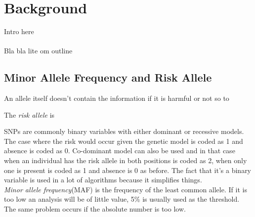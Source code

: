 \documentclass[10pt,a4paper]{report}
\begin{document}

\clearpage
\chapter{Background}
Intro here\\
\\
Bla bla lite om outline

\section{Minor Allele Frequency and Risk Allele}
An allele itself doesn't contain the information if it is harmful or not so to

The \emph{risk allele} is


SNPs are commonly binary variables with either dominant or recessive models. The case where the risk would occur given the genetic model is coded as 1 and absence is coded as 0. Co-dominant model can also be used and in that case when an individual has the risk allele in both positions is coded as 2, when only one is present is coded as 1 and absence is 0 as before. The fact that it's a binary variable is used in a lot of algorithms because it simplifies things.\\



\emph{Minor allele frequency}(MAF) is the frequency of the least common allele. If it is too low an analysis will be of little value, 5\% is usually used as the threshold. The same problem occurs if the absolute number is too low.
\end{document}
